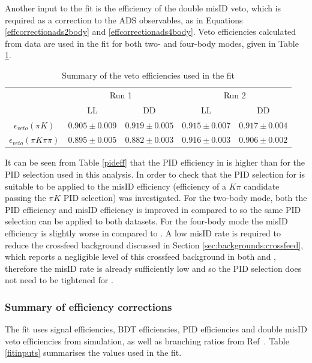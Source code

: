 Another input to the fit is the efficiency of the double misID veto, which is required as a correction to the ADS observables, as in Equations \ref{effcorrectionads2body} and \ref{effcorrectionads4body}. Veto efficiencies calculated from data are used in the \CP fit for both two- and four-body modes, given in Table \ref{vetoeff}.

\begin{table}[h]
\centering
\begin{tabular}{c|cc|cc}
\hline
& \multicolumn{2}{c}{Run 1} & \multicolumn{2}{c}{Run 2} \\
& LL & DD & LL & DD \\
\hline
$\epsilon_{veto}(\pi K)$ & $0.905 \pm 0.009$ & $0.919 \pm 0.005$ & $0.915 \pm 0.007$ & $0.917 \pm 0.004$ \\
$\epsilon_{veto}(\pi K \pi\pi)$ & $0.895 \pm 0.005$ & $0.882 \pm 0.003$ & $0.916 \pm 0.003$ & $0.906 \pm 0.002$ \\
\hline
\end{tabular}
\caption{Summary of the veto efficiencies used in the \CP fit}
\label{vetoeff}
\end{table}

It can be seen from Table \ref{pideff} that the PID efficiency in \runtwo is higher than \runone for the PID selection used in this analysis. In order to check that the PID selection for \runone is suitable to be applied to \runtwo the misID efficiency (efficiency of a $K\pi$ candidate passing the $\pi K$ PID selection) was investigated. For the two-body mode, both the PID efficiency and misID efficiency is improved in \runtwo compared to \runone so the same PID selection can be applied to both datasets. For the four-body mode the misID efficiency is slightly worse in \runtwo compared to \runone. A low misID rate is required to reduce the crossfeed background discussed in Section \ref{sec:backgrounds:crossfeed}, which reports a negligible level of this crossfeed background in both \runone and \runtwo, therefore the misID rate is already sufficiently low and so the PID selection does not need to be tightened for \runtwo.

\subsubsection{Summary of efficiency corrections}
\label{sec:cpfit:efficiencies:summary}

The \CP fit uses signal efficiencies, BDT efficiencies, PID efficiencies and double misID veto efficiencies from simulation, as well as branching ratios from Ref~\cite{PDG2016}. Table \ref{fitinputs} summarises the values used in the \CP fit. 

